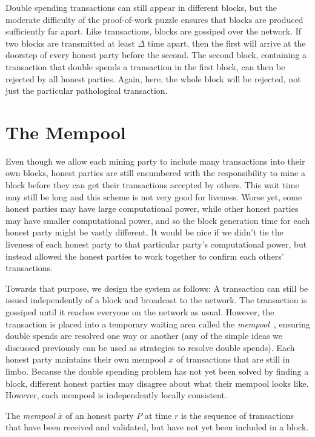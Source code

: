 Double spending transactions can still appear in different blocks, but the moderate difficulty
of the proof-of-work puzzle ensures that blocks are produced sufficiently far apart. Like
transactions, blocks are gossiped over the network. If two blocks are transmitted at least
$\Delta$ time apart, then the first will arrive at the doorstep of every honest party before
the second. The second block, containing a transaction that double spends a transaction in the
first block, can then be rejected by all honest parties. Again, here, the whole block will be
rejected, not just the particular pathological transaction.

\section{The Mempool}

Even though we allow each mining party to include many transactions into their own blocks,
honest parties are still encumbered with the responsibility to mine a block before they can
get their transactions accepted by others. This wait time may still be long and this scheme
is not very good for liveness. Worse yet, some honest parties may have large computational
power, while other honest parties may have smaller computational power, and so the block
generation time for each honest party might be vastly different. It would be nice if we didn't
tie the liveness of each honest party to that particular party's computational power, but
instead allowed the honest parties to work together to confirm each others' transactions.

Towards that purpose, we design the system as follows: A transaction can still be issued
independently of a block and broadcast to the network. The transaction is gossiped until
it reaches everyone on the network as usual. However, the transaction is placed into a
temporary waiting area called the \emph{mempool}~, ensuring double spends are
resolved one way or another (any of the simple ideas we discussed previously can be used as
strategies to resolve double spends).
Each honest party maintains their own mempool $\overline{x}$ of transactions that are still in limbo.
Because the double spending problem has not yet been solved by finding a block, different
honest parties may disagree about what their mempool looks like.
However, each mempool is independently locally consistent.

\begin{definition}[Mempool]
    The \emph{mempool} $\overline{x}$ of an honest party $P$ at time $r$ is the sequence of transactions
    that have been received and validated, but have not yet been included in a block.
\end{definition}

